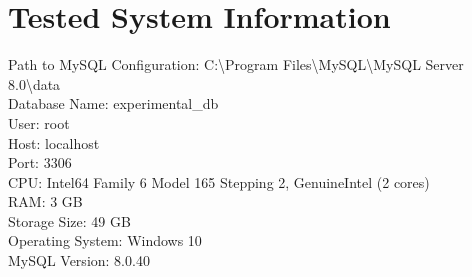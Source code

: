 
            \newpage
            \section*{Tested System Information}
            \noindent Path to MySQL Configuration: C:\textbackslash{}Program Files\textbackslash{}MySQL\textbackslash{}MySQL Server 8.0\textbackslash{}data \\
            Database Name: experimental\_db \\
            User: root \\
            Host: localhost \\
            Port: 3306 \\
            CPU: Intel64 Family 6 Model 165 Stepping 2, GenuineIntel (2 cores) \\
            RAM: 3 GB \\
            Storage Size: 49 GB \\
            Operating System: Windows 10 \\
            MySQL Version: 8.0.40
                
